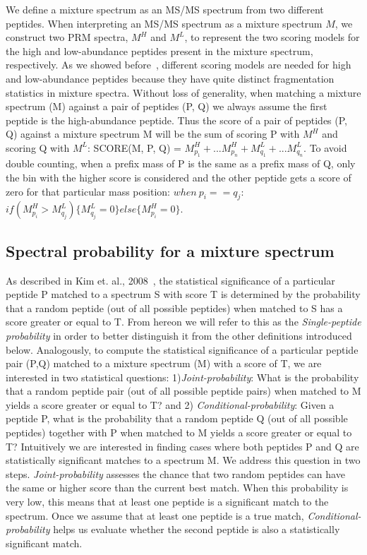 \documentclass[runningheads,a4paper]{llncs}
\begin{document}
We define a mixture spectrum as an MS/MS spectrum from two different peptides. When interpreting an MS/MS spectrum as a mixture spectrum $M$, we construct two PRM spectra, $M^{H}$ and $M^{L}$, to represent the two scoring models for the high and low-abundance peptides present in the mixture spectrum, respectively.  As we showed before~\cite{wang2011peptide}, different scoring models are needed for high and low-abundance peptides because they have quite distinct fragmentation statistics in mixture spectra.  Without loss of generality, when matching a mixture spectrum (M) against a pair of peptides (P, Q) we always assume the first peptide is the high-abundance peptide.  Thus the score of a pair of peptides (P, Q) against a mixture spectrum M will be the sum of scoring P with $M^{H}$ and scoring Q with $M^{L}$: SCORE(M, P, Q) = $M^{H}_{p_{1}} + ... M^{H}_{p_{n}} + M^{L}_{q_{1}} + ... M^{L}_{q_{n}}$. To avoid double counting, when a prefix mass of P is the same as a prefix mass of Q, only the bin with the higher score is considered and the other peptide gets a score of zero for that particular mass position:
$when\ p_{i} == q_{j}:$
$ if(M^{H}_{p_{i}} > M^{L}_{q_{j}})
  \{ M^{L}_{q_{j}} = 0 \}
 else \{ M^H_{p_{i}} = 0 \}$.

\subsection*{Spectral probability for a mixture spectrum}
As described in Kim et. al., 2008~\cite{kim2008spectral}, the statistical significance of a particular peptide P matched to a spectrum S with score T is determined by the probability that a random peptide (out of all possible peptides) when matched to S has a score greater or equal to T. From hereon we will refer to this as the \emph{Single-peptide probability} in order to better distinguish it from the other definitions introduced below.   Analogously, to compute the statistical significance of a particular peptide pair (P,Q) matched to a mixture spectrum (M) with a score of T, we are interested in two statistical questions: 1)\emph{Joint-probability}: What is the probability that a random peptide pair (out of all possible peptide pairs) when matched to M yields a score greater or equal to T? and 2) \emph{Conditional-probability}: Given a peptide P, what is the probability that a random peptide Q (out of all possible peptides) together with P when matched to M yields a score greater or equal to T?  Intuitively we are interested in finding cases where both peptides P and Q are statistically significant matches to a spectrum M. We address this question in two steps.  \emph{Joint-probability} assesses the chance that two random peptides can have the same or higher score than the current best match.  When this probability is very low, this means that at least one peptide is a significant match to the spectrum. Once we assume that at least one peptide is a true match, \emph{Conditional-probability} helps us evaluate whether the second peptide is also a statistically significant match.
\end{document}
